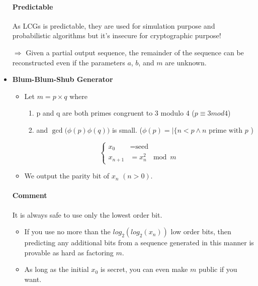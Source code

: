 \begin{itemize}
        \paragraph{Predictable}
        As LCGs is predictable, they are used for simulation purpose and probabilistic
        algorithms but it's insecure
        for cryptographic purpose!

        $\Rightarrow$ Given a partial output sequence, the remainder of
        the sequence can be reconstructed even if the parameters $a$, $b$,
        and $m$ are unknown.

    \item \textbf{Blum-Blum-Shub Generator}
        \begin{itemize}
            \item Let $m=p\times q$ where 
                \begin{enumerate}
                        \item p and q are both primes congruent to 3 modulo
                4 ($p \equiv 3 mod 4$)
                        \item and $ \gcd{\big(\phi(p)}{\phi(q)\big)} $
                            is small. ($\phi(p) = |\{ n < p \wedge n
                                \textrm{ prime with } p$ )
                            \end{enumerate}
                $$\begin{cases}
                        x_0 & = \textrm{seed}\\
                        x_{n+1} & = x^2_n\ \mod{m}
                        \end{cases}$$
            \item We output the parity bit of $x_n$ $(n>0)$.
        \end{itemize}

        \paragraph{Comment}
        It is always safe to use only the lowest order bit. 
        \begin{itemize}
            \item If you use no more than the $log_2 (log_2 (x_n ))$ low order bits, then predicting
                any additional bits from a sequence generated in this manner is
                provable as hard as factoring $m$. 
            \item As long as the initial $x_0$ is secret,
                you can even make $m$ public if you want.
        \end{itemize}


\end{itemize}
